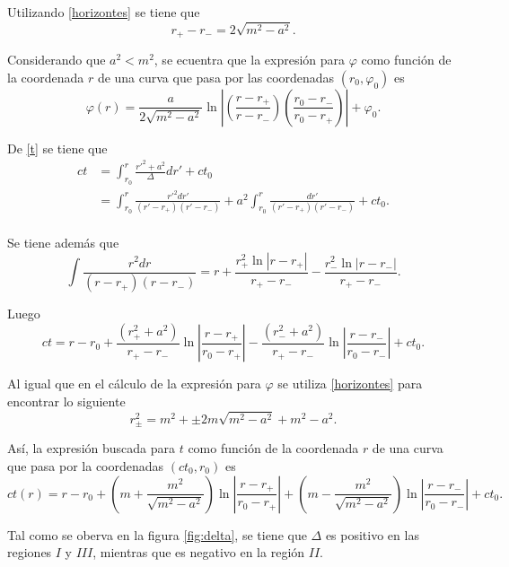  Utilizando \eqref{horizontes} se tiene que 
 $$r_+-r_-=2\sqrt{m^2-a^2}.$$ 
 
 Considerando que $a^2<m^2$, se ecuentra que la expresi\'on para $\varphi$ como funci\'on de la coordenada $r$ de una curva que pasa por las coordenadas $(r_0,\varphi_0)$ es
\begin{equation}\label{congphi}
\boxed{\varphi(r)=\frac{a}{2\sqrt{m^2-a^2}}\ln \left|\left(\frac{r-r_+}{r-r_-}\right)\left(\frac{r_0-r_-}{r_0-r_+} \right)\right| + \varphi_0.}
\end{equation}  

De \eqref{t} se tiene que
\begin{equation}
\begin{aligned}
ct&=\int_{r_0}^r\frac{r'^2+a^2}{\Delta}dr'+ct_0\\
&=\int_{r_0}^r \frac{r'^2dr'}{(r'-r_+)(r'-r_-)}+a^2\int_{r_0}^r\frac{dr'}{(r'-r_+)(r'-r_-)}+ct_0.\\
\end{aligned}
\end{equation}

Se tiene adem\'as que
\begin{equation}
\int \frac{r^2dr}{(r-r_+)(r-r_-)}=r+\frac{r_{+}^2 \ln |r-r_+|}{r_+-r_-}-\frac{r_{-}^2\ln |r-r_-|}{r_+-r_-}.
\end{equation}

Luego
\begin{equation}
ct=r-r_0+\frac{(r_+^2+a^2)}{r_+-r_-}\ln\left|\frac{r-r_+}{r_0-r_+}\right|-\frac{(r_-^2+a^2)}{r_+-r_-}\ln \left|\frac{r-r_-}{r_0-r_-}\right|+ct_0.
\end{equation}

Al igual que en el c\'alculo de la expresi\'on para $\varphi$ se utiliza \eqref{horizontes} para encontrar lo siguiente
\begin{equation*}
r_{\pm}^2=m^2+\pm 2m\sqrt{m^2-a^2}+m^2-a^2.
\end{equation*}

As\'i, la expresi\'on buscada para $t$ como funci\'on de la coordenada $r$ de una curva que pasa por la coordenadas $(ct_0,r_0)$ es
\begin{equation}\label{congt}
\boxed{ct(r)=r-r_0+\left(m+\frac{m^2}{\sqrt{m^2-a^2}} \right)\ln\left|\frac{r-r_+}{r_0-r_+}\right|+\left(m-\frac{m^2}{\sqrt{m^2-a^2}} \right)\ln \left|\frac{r-r_-}{r_0-r_-}\right|+ct_0 .}
\end{equation}

Tal como se oberva en la figura \ref{fig:delta}, se tiene que $\Delta$ es positivo en las regiones $I$ y $III$, mientras que es negativo en la regi\'on $II$.

